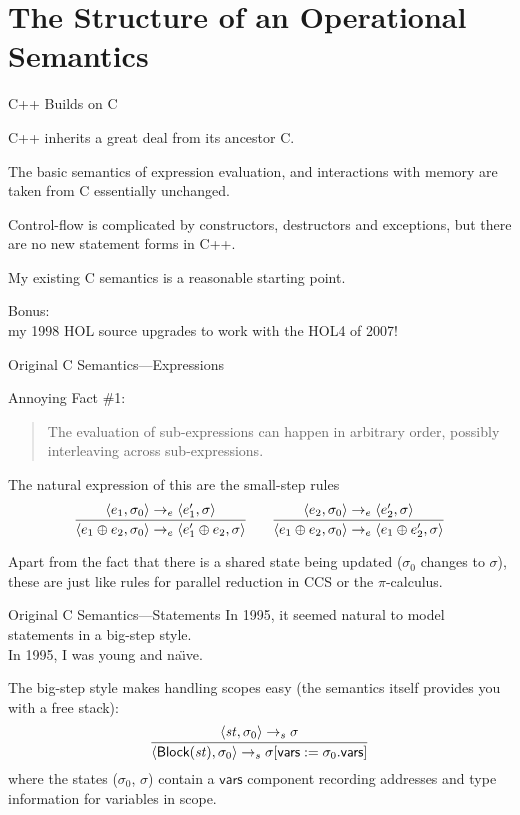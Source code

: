 \documentclass[compress,dvips,color=usenames,xcolor=dvipsnames]{beamer}
\newcommand{\cpp}{\mbox{C\hspace{-.1em}+\hspace{-.05em}+}}
\begin{document}
\section{The Structure of an Operational Semantics}
\begin{frame}{\cpp{} Builds on C}

\cpp{} inherits a great deal from its ancestor C.

\bigskip
The basic semantics of expression evaluation, and interactions with
memory are taken from C essentially unchanged.

\bigskip
Control-flow is complicated by constructors, destructors and
exceptions, but there are no new statement forms in \cpp.

\bigskip My existing C semantics is a reasonable starting point.

\bigskip \footnotesize
Bonus:\\
\quad my 1998 HOL source upgrades to work with the HOL4 of 2007!

\end{frame}

\begin{frame}{Original C Semantics---Expressions}

Annoying Fact \#1:
\begin{quote}
   The evaluation of sub-expressions can happen in arbitrary order,
   possibly interleaving across sub-expressions.
\end{quote}

\bigskip
The natural expression of this are the small-step rules
\[
\infer{
  \langle e_1 \oplus e_2, \sigma_0\rangle \rightarrow_e
  \langle e_1' \oplus e_2, \sigma\rangle
}{
  \langle e_1, \sigma_0\rangle \rightarrow_e \langle e_1',\sigma\rangle
} \qquad
\infer{
  \langle e_1 \oplus e_2, \sigma_0\rangle \rightarrow_e
  \langle e_1 \oplus e_2', \sigma\rangle
}{
  \langle e_2, \sigma_0\rangle \rightarrow_e \langle e_2',\sigma\rangle
}
\]

\bigskip Apart from the fact that there is a shared state being
updated ($\sigma_0$ changes to $\sigma$), these are just like rules
for parallel reduction in CCS or the $\pi$-calculus.
\end{frame}

\begin{frame}{Original C Semantics---Statements}
  In 1995, it seemed natural to model statements in a big-step
  style.\\
  In 1995, I was young and na\"\i{}ve.

\bigskip
The big-step style makes handling scopes easy (the semantics itself
provides you with a free stack):
\[
\infer{
  \langle \textsf{Block}(\mathit{st}), \sigma_0\rangle
  \rightarrow_s
  \sigma[\textsf{vars} := \sigma_0.\textsf{vars}]
}{
  \langle \mathit{st}, \sigma_0\rangle \rightarrow_s \sigma
}
\]
where the states ($\sigma_0$, $\sigma$) contain a $\textsf{vars}$
component recording addresses and type information for variables in
scope.

\end{frame}
\end{document}

